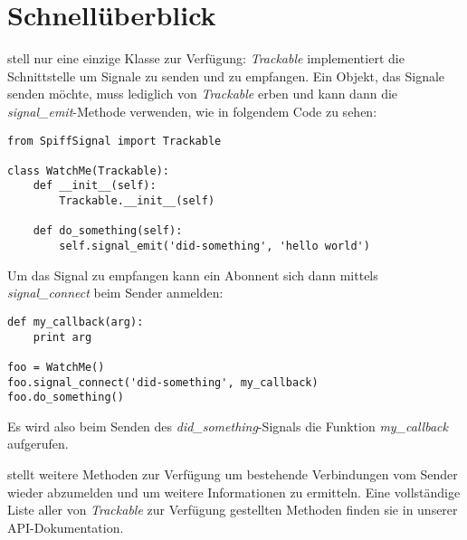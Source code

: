

\newpage
\section{Schnellüberblick}

\product stell nur eine einzige Klasse zur Verfügung: {\it Trackable} 
implementiert die Schnittstelle um Signale zu senden und zu empfangen.
Ein Objekt, das Signale senden möchte, muss lediglich von {\it Trackable} 
erben und kann dann die {\it signal\_emit}-Methode verwenden, wie in folgendem 
Code zu sehen:

\begin{lstlisting}
from SpiffSignal import Trackable

class WatchMe(Trackable):
    def __init__(self):
        Trackable.__init__(self)
    
    def do_something(self):
        self.signal_emit('did-something', 'hello world')
\end{lstlisting}

Um das Signal zu empfangen kann ein Abonnent sich dann mittels 
{\it signal\_connect} beim Sender anmelden:

\begin{lstlisting}
def my_callback(arg):
    print arg

foo = WatchMe()
foo.signal_connect('did-something', my_callback)
foo.do_something()
\end{lstlisting}

Es wird also beim Senden des {\it did\_something}-Signals die Funktion 
{\it my\_callback} aufgerufen.

\product stellt weitere Methoden zur Verfügung um bestehende Verbindungen 
vom Sender wieder abzumelden und um weitere Informationen zu ermitteln. 
Eine vollständige Liste aller von {\it Trackable} zur Verfügung 
gestellten Methoden finden sie in unserer API-Dokumentation.

